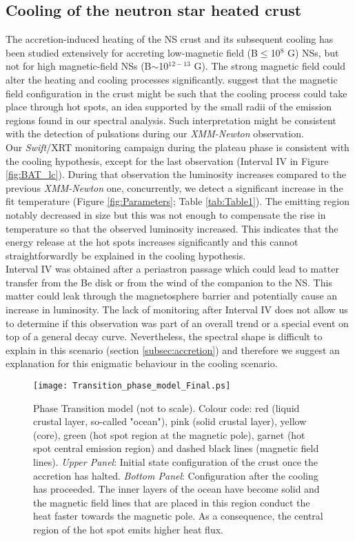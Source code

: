 \documentclass[a4paper,fleqn,usenatbib]{mnras}
\begin{document}
\subsection{Cooling of the neutron star heated crust}\label{subsec:cooling}
The accretion-induced heating of the NS crust and its subsequent cooling has been studied extensively for accreting low-magnetic field (B$\leq$10$^8$ G) NSs, but not for high magnetic-field NSs (B$\sim$10$^{12-13}$ G). The strong magnetic field could alter the heating and cooling processes significantly. \cite{Wijnands2016} suggest that the magnetic field configuration in the crust might be such that the cooling process could take place through hot spots, an idea supported by the small radii of the emission regions found in our spectral analysis. Such interpretation might be consistent with the detection of pulsations during our \textit{XMM-Newton} observation.\\
\indent Our \textit{Swift}/XRT monitoring campaign during the plateau phase is consistent with the cooling hypothesis, except for the last observation (Interval IV in Figure \ref{fig:BAT_lc}). During that observation the luminosity increases compared to the previous \textit{XMM-Newton} one, concurrently, we detect a significant increase in the fit temperature (Figure \ref{fig:Parameters}; Table \ref{tab:Table1}). The emitting region notably decreased in size but this was not enough to compensate the rise in temperature so that the observed luminosity increased. This indicates that the energy release at the hot spots increases significantly and this cannot straightforwardly be explained in the cooling hypothesis.\\
\indent Interval IV was obtained after a periastron passage which could lead to matter transfer from the Be disk or from the wind of the companion to the NS. This matter could leak through the magnetosphere barrier and potentially cause an increase in luminosity. The lack of monitoring after Interval IV does not allow us to determine if this observation was part of an overall trend or a special event on top of a general decay curve. Nevertheless, the spectral shape is difficult to explain in this scenario (section \ref{subsec:accretion}) and therefore we suggest an explanation for this enigmatic behaviour in the cooling scenario.\\
\begin{figure}
\centering
\texttt{[image: Transition\_phase\_model\_Final.ps]}
    \caption{Phase Transition model (not to scale). Colour code: red (liquid crustal layer, so-called "ocean"), pink (solid crustal layer), yellow (core), green (hot spot region at the magnetic pole), garnet (hot spot central emission region) and dashed black lines (magnetic field lines). \textit{Upper Panel}: Initial state configuration of the crust once the accretion has halted. \textit{Bottom Panel}: Configuration after the cooling has proceeded. The inner layers of the ocean have become solid and the magnetic field lines that are placed in this region conduct the heat faster towards the magnetic pole. As a consequence, the central region of the hot spot emits higher heat flux.}
   \label{fig:Phase_model}
\end{figure}
\end{document}
